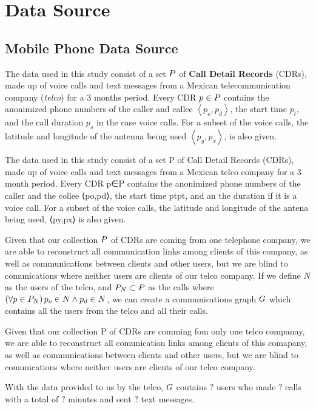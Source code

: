 \section{Data Source}

\subsection{Mobile Phone Data Source}

The data used in this study consist of a set \( \mathlarger{P} \) of \textbf{Call Detail Records} (CDRs), made up of voice calls and text messages from a Mexican telecommunication company (\textit{telco}) for a 3 months period.
Every CDR \( p \in \mathlarger{P} \)  contains the anonimized phone numbers of the caller and callee \( \left< p_o, p_d \right> \), the start time \( p_t \), and the call duration \( p_s \) in the case voice calls. 
For a subset of the voice calls, the latitude and longitude of the antenna being used \( \left< p_y, p_x \right> \), is also given.

The data used in this study consist of a set P of Call Detail Records (CDRs), made up of voice calls and text messages from a Mexican telco company for a 3 month period. Every CDR p∈P contains the anonimized phone numbers of the caller and the collee ⟨po,pd⟩, the start time ptpt, and an the duration if it is a voice call. For a subset of the voice calls, the latitude and longitude of the antena being used, ⟨py,px⟩ is also given.


Given that our collection \( \mathlarger{P} \) of CDRs are
coming from one telephone company, 
we are able to reconstruct all communication links among clients of this company, as well as communications between clients and other users, but we are blind to comunications where neither users are clients of our telco company.
If we define \( N \) as the users of the telco, and \( \mathlarger{P}_N \subset \mathlarger{P} \) as the calls where \( \left( \forall p \in \mathlarger{P}_N \right) p_o \in N \wedge p_d \in N \), we can create a communications graph \( \mathlarger{G} \) which contains all the users from the telco and all their calls.

Given that our collection P of CDRs are comming fom only one telco companay, we are able to reconstruct all comunication links among clients of this comapany, as well as communications between clients and other users, but we are blind to comunications where neither users are clients of our telco company.

With the data provided to us by the telco, \( \mathlarger{G} \) contains \( ? \) users who made \( ? \) calls with a total of \( ? \) minutes and sent \( ? \) text messages.
